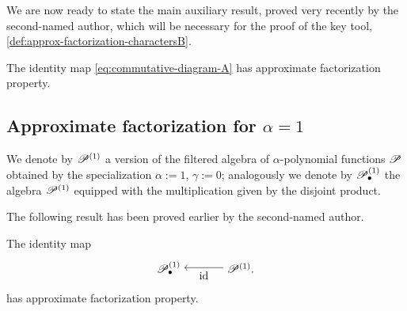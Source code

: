 \documentclass[12pt,usenames,dvipsnames,svgnames,table]{amsart}
\begin{document}
\medskip

We are now ready to state the main auxiliary result, 
proved very recently by the second-named author,
which will be necessary for the proof of the key tool, \cref{def:approx-factorization-charactersB}.

\begin{theorem}
	\label{theo:factorization-of-characters}
	The identity map \eqref{eq:commutative-diagram-A}
	has approximate factorization property.
\end{theorem}

\subsection{Approximate factorization for $\alpha=1$}

We denote by $\mathscr{P}^{(1)}$ a version of the filtered algebra of $\alpha$-polynomial functions
$\mathscr{P}$ obtained by the specialization $\alpha:=1$, $\gamma:=0$; 
analogously we denote by $\mathscr{P}^{(1)}_\bullet$ the algebra $\mathscr{P}^{(1)}$
equipped with the multiplication given by the disjoint product.

The following result has been proved earlier by the second-named author.
\begin{theorem}
	\label{theo:aprox-fact-property-oldversion}
	The identity map
	\tikzexternaldisable
	\begin{equation}
	\label{eq:commutative-diagram-Aprim}
	\begin{tikzpicture}[node distance=2.3cm, auto, baseline=-0.8ex]
	\node (A) {$\Poly^{(1)}_\disjoint$};
	\node (B) [right of=A] {$\Poly^{(1)}.$};
	
	\draw[<-,swap] (A) to node {$\id$} (B);
	\end{tikzpicture}
	\end{equation}
	\tikzexternalenable
	has approximate factorization property.
\end{theorem}
\end{document}
